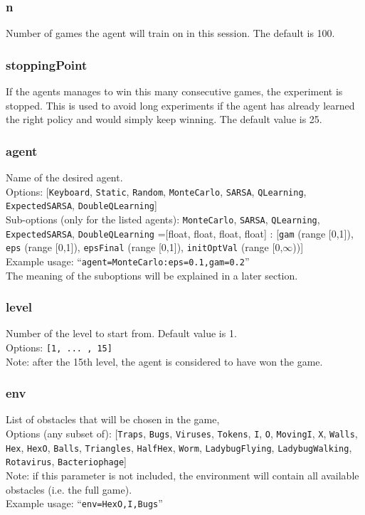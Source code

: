 \subsubsection*{n}
\label{opt:n}
Number of games the agent will train on in this session. The default is 100.

\subsubsection*{stoppingPoint}
\label{opt:stoppingPoint}
If the agents manages to win this many consecutive games, the experiment is stopped. This is used to avoid long experiments if the agent has already learned the right policy and would simply keep winning. The default value is 25.

\subsubsection*{agent}
\label{opt:agent}
Name of the desired agent. \\
Options: [\texttt{Keyboard}, \texttt{Static}, \texttt{Random}, \texttt{MonteCarlo}, \texttt{SARSA}, \texttt{QLearning}, \\ \texttt{ExpectedSARSA}, \texttt{DoubleQLearning}]\\
Sub-options (only for the listed agents):
\texttt{MonteCarlo}, \texttt{SARSA}, \texttt{QLearning}, \texttt{ExpectedSARSA}, \texttt{DoubleQLearning}
=[float, float, float, float] :
[\texttt{gam} (range [0,1]), \texttt{eps} (range [0,1]), \texttt{epsFinal} (range [0,1]), \texttt{initOptVal} (range [0,$\infty$))]\\
Example usage: ``\texttt{agent=MonteCarlo:eps=0.1,gam=0.2}''\\
The meaning of the suboptions will be explained in a later section.

\subsubsection*{level}
\label{opt:level}
Number of the level to start from. Default value is 1.\\
Options: \texttt{[1, ... , 15]}\\
Note: after the 15th level, the agent is considered to have won the game.

\subsubsection*{env}
\label{opt:env}
List of obstacles that will be chosen in the game,\\
Options (any subset of): [\texttt{Traps}, \texttt{Bugs}, \texttt{Viruses}, \texttt{Tokens},
\texttt{I}, \texttt{O}, \texttt{MovingI}, \texttt{X}, \texttt{Walls}, \texttt{Hex},
\texttt{HexO}, \texttt{Balls}, \texttt{Triangles}, \texttt{HalfHex},
\texttt{Worm}, \texttt{LadybugFlying}, \texttt{LadybugWalking},
\texttt{Rotavirus}, \texttt{Bacteriophage}]\\
Note: if this parameter is not included, the environment will contain all available obstacles (i.e. the full game).\\
Example usage: ``\texttt{env=HexO,I,Bugs}''\\


